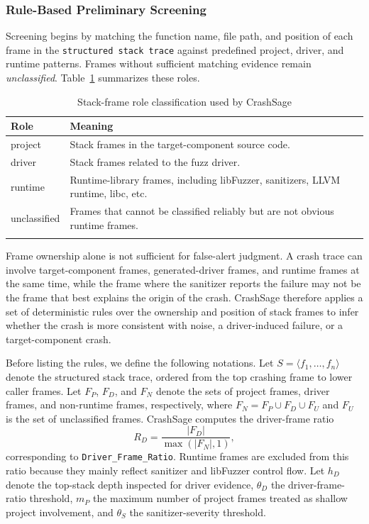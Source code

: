 \documentclass[pdflatex,sn-basic]{sn-jnl}%
\renewcommand{\arraystretch}{1.16}%
\theoremstyle{thmstyleone}%
\theoremstyle{thmstyletwo}%
\theoremstyle{thmstylethree}%
\begin{document}
\subsubsection{Rule-Based Preliminary Screening}
Screening begins by matching the function name, file path, and position of each frame in the \texttt{structured stack trace} against predefined project, driver, and runtime patterns.
Frames without sufficient matching evidence remain \emph{unclassified}.
Table~\ref{tab:stack-frame-roles} summarizes these roles.

\begin{table}[t]
\caption{Stack-frame role classification used by CrashSage}
\label{tab:stack-frame-roles}
\centering
\scriptsize
\setlength{\tabcolsep}{4.0pt}
\renewcommand{\arraystretch}{1.10}
\begin{tabular*}{\linewidth}{@{\extracolsep{\fill}}ll}
\toprule
\textbf{Role} & \textbf{Meaning} \\
\midrule
project & Stack frames in the target-component source code. \\
driver & Stack frames related to the fuzz driver. \\
runtime & Runtime-library frames, including libFuzzer, sanitizers, LLVM runtime, libc, etc. \\
unclassified & Frames that cannot be classified reliably but are not obvious runtime frames. \\
\botrule
\end{tabular*}
\end{table}

Frame ownership alone is not sufficient for false-alert judgment.
A crash trace can involve target-component frames, generated-driver frames, and runtime frames at the same time, while the frame where the sanitizer reports the failure may not be the frame that best explains the origin of the crash.
CrashSage therefore applies a set of deterministic rules over the ownership and position of stack frames to infer whether the crash is more consistent with noise, a driver-induced failure, or a target-component crash.

Before listing the rules, we define the following notations.
Let \(S=\langle f_1,\ldots,f_n\rangle\) denote the structured stack trace, ordered from the top crashing frame to lower caller frames.
Let \(F_P\), \(F_D\), and \(F_N\) denote the sets of project frames, driver frames, and non-runtime frames, respectively, where \(F_N=F_P\cup F_D\cup F_U\) and \(F_U\) is the set of unclassified frames.
CrashSage computes the driver-frame ratio
\begin{equation}
R_D=\frac{|F_D|}{\max(|F_N|,1)} ,
\end{equation}
corresponding to \texttt{Driver\_Frame\_Ratio}.
Runtime frames are excluded from this ratio because they mainly reflect sanitizer and libFuzzer control flow.
Let \(h_D\) denote the top-stack depth inspected for driver evidence, \(\theta_D\) the driver-frame-ratio threshold, \(m_P\) the maximum number of project frames treated as shallow project involvement, and \(\theta_S\) the sanitizer-severity threshold.
\end{document}
